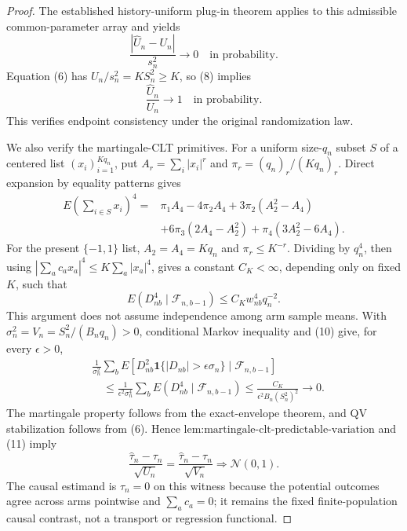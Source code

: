 \documentclass{article}
\begin{document}
\begin{proof}
The established history-uniform plug-in theorem applies to this admissible common-parameter array and yields
\[
\frac{|\widehat U_n-U_n|}{s_n^2}\longrightarrow0
\quad\text{in probability}.
\tag{8}
\]
Equation (6) has \(U_n/s_n^2=KS_n^2\ge K\), so (8) implies
\[
\frac{\widehat U_n}{U_n}\longrightarrow1
\quad\text{in probability}.
\tag{9}
\]
This verifies endpoint consistency under the original randomization law.

We also verify the martingale-CLT primitives.  For a uniform size-\(q_n\) subset \(S\) of a centered list \((x_i)_{i=1}^{Kq_n}\), put \(A_r=\sum_i|x_i|^r\) and \(\pi_r=(q_n)_r/(Kq_n)_r\).  Direct expansion by equality patterns gives
\[
\begin{aligned}
E\left(\sum_{i\in S}x_i\right)^4
={}&\pi_1A_4-4\pi_2A_4+3\pi_2(A_2^2-A_4)\\
&+6\pi_3(2A_4-A_2^2)+\pi_4(3A_2^2-6A_4).
\end{aligned}
\]
For the present \(\{-1,1\}\) list, \(A_2=A_4=Kq_n\) and \(\pi_r\le K^{-r}\).  Dividing by \(q_n^4\), then using \(|\sum_ac_ax_a|^4\le K\sum_a|x_a|^4\), gives a constant \(C_K<\infty\), depending only on fixed \(K\), such that
\[
E(D_{nb}^4\mid\mathcal F_{n,b-1})
\le C_Kw_{nb}^4q_n^{-2}.
\tag{10}
\]
This argument does not assume independence among arm sample means.  With \(\sigma_n^2=V_n=S_n^2/(B_nq_n)>0\), conditional Markov inequality and (10) give, for every \(\epsilon>0\),
\[
\begin{aligned}
&\frac1{\sigma_n^2}\sum_bE\!\left[D_{nb}^2
 \mathbf1\{|D_{nb}|>\epsilon\sigma_n\}\mid\mathcal F_{n,b-1}\right]\\
&\quad\le\frac1{\epsilon^2\sigma_n^4}\sum_bE(D_{nb}^4\mid\mathcal F_{n,b-1})
\le\frac{C_K}{\epsilon^2B_n(S_n^2)^2}\longrightarrow0.
\end{aligned}
\tag{11}
\]
The martingale property follows from the exact-envelope theorem, and QV stabilization follows from (6).  Hence \(\text{lem:martingale-clt-predictable-variation}\) and (11) imply
\[
\frac{\widehat\tau_n-\tau_n}{\sqrt{U_n}}
=\frac{\widehat\tau_n-\tau_n}{\sqrt{V_n}}
\Rightarrow\mathcal N(0,1).
\tag{12}
\]
The causal estimand is \(\tau_n=0\) on this witness because the potential outcomes agree across arms pointwise and \(\sum_ac_a=0\); it remains the fixed finite-population causal contrast, not a transport or regression functional.


\end{proof}
\end{document}
